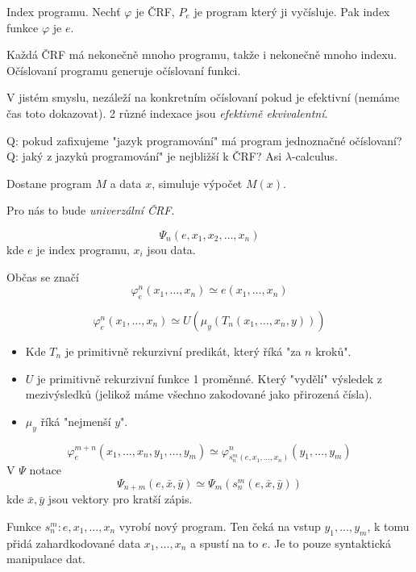 \begin{definition}
	Index programu.
	Nechť $\varphi$ je ČRF, $P_e$ je program který ji vyčísluje.
	Pak index funkce $\varphi$ je $e$.
\end{definition}

\begin{note}
	Každá ČRF má nekonečně mnoho programu, takže i nekonečně mnoho indexu.
	Očíslovaní programu generuje očíslovaní funkci.

	V jistém smyslu, nezáleží na konkretním očíslovaní pokud je efektivní (nemáme čas toto dokazovat).
	2 různé indexace jsou \emph{efektivně ekvivalentní}.
\end{note}

Q: pokud zafixujeme "jazyk programování" má program jednoznačné očíslovaní?
Q: jaký z jazyků programování" je nejbližší k ČRF? Asi $\lambda$-calculus.

\begin{reminder}[Univerzální TS]
	Dostane program $M$ a data $x$, simuluje výpočet $M(x)$.

	Pro nás to bude \emph{univerzální ČRF}.
\end{reminder}

\begin{definition}
	\[ \Psi_n(e, x_1, x_2, \ldots, x_n) \]
	kde $e$ je index programu, $x_i$ jsou data.

	Občas se značí
	\[ \varphi_e^n(x_1, \ldots, x_n) \simeq {e}(x_1, \ldots, x_n) \]
\end{definition}

\begin{notation}
	\[ \varphi_e^n(x_1, \ldots, x_n) \simeq U(\mu_y(T_n(x_1, \ldots, x_n, y))) \]

	\begin{itemize}
		\item Kde $T_n$ je primitivně rekurzivní predikát, který říká "za $n$ kroků".
		\item $U$ je primitivně rekurzivní funkce 1 proměnné.
			Který "vydělí" výsledek z mezivýsledků (jelikož máme všechno zakodované jako přirozená čísla).
		\item $\mu_y$ říká "nejmenší $y$".
	\end{itemize}
\end{notation}

\begin{theorem}[s-m-n (BD)]\label{s_m_n}
	\[ \varphi_e^{m + n}(x_1, \ldots, x_n, y_1, \ldots, y_m) \simeq \varphi_{s_n^m(e, x_1, \ldots, x_n)}^n(y_1, \ldots, y_m) \]
	V $\Psi$ notace
	\[ \Psi_{n + m}(e, \bar{x}, \bar{y}) \simeq \Psi_m(s_n^m(e, \bar{x}, \bar{y})) \]
	kde $\bar{x}, \bar{y}$ jsou vektory pro kratší zápis.

	Funkce $s_n^m: e, x_1, \ldots, x_n$ vyrobí nový program.
	Ten čeká na vstup $y_1, \ldots, y_m$, k tomu přidá zahardkodované data $x_1, \ldots, x_n$ a spustí na to $e$.
	Je to pouze syntaktická manipulace dat.
\end{theorem}


